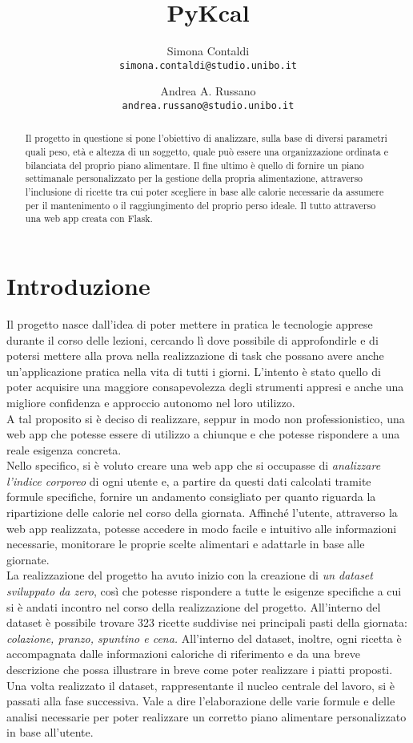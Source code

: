 \documentclass[11pt]{article}
\title{PyKcal}
\author{
  Simona Contaldi\\
  {\tt simona.contaldi@studio.unibo.it} \\
  \and
  Andrea A. Russano\\
  {\tt andrea.russano@studio.unibo.it} \\
}
\date{}
\begin{document}
\maketitle
\begin{abstract}
Il progetto in questione si pone l’obiettivo di analizzare, sulla base di diversi parametri quali peso, età e altezza di un soggetto, quale può essere una organizzazione ordinata e bilanciata del proprio piano alimentare. Il fine ultimo è quello di fornire un piano settimanale personalizzato per la gestione della propria alimentazione, attraverso l'inclusione di ricette tra cui poter scegliere in base alle calorie necessarie da assumere per il mantenimento o il raggiungimento del proprio perso ideale. Il tutto attraverso una web app creata con Flask.
\end{abstract}


\section{Introduzione}

Il progetto nasce dall’idea di poter mettere in pratica le tecnologie apprese durante il corso delle lezioni, cercando lì dove possibile di approfondirle e di potersi mettere alla prova nella realizzazione di task che possano avere anche un'applicazione pratica nella vita di tutti i giorni. 
L'intento è stato quello di poter acquisire una maggiore consapevolezza degli strumenti appresi e anche una migliore confidenza e approccio autonomo nel loro utilizzo. \\
A tal proposito si è deciso di realizzare, seppur in modo non professionistico, una web app che potesse essere di utilizzo a chiunque e che potesse rispondere a una reale esigenza concreta.\\ Nello specifico, si è voluto creare una web app che si occupasse di \textit{analizzare l’indice corporeo} di ogni utente e, a partire da questi dati calcolati tramite formule specifiche, fornire un andamento consigliato per quanto riguarda la ripartizione delle calorie nel corso della giornata. Affinché l'utente, attraverso la web app realizzata, potesse accedere in modo facile e intuitivo alle informazioni necessarie, monitorare le proprie scelte alimentari e adattarle in base alle giornate. \\La realizzazione del progetto ha avuto inizio con la creazione di \textit{un dataset sviluppato da zero}, così che potesse rispondere a tutte le esigenze specifiche a cui si è andati incontro nel corso della realizzazione del progetto. All’interno del dataset è possibile trovare 323 ricette suddivise nei principali pasti della giornata:\textit{ colazione, pranzo, spuntino e cena.} All'interno del dataset, inoltre, ogni ricetta è accompagnata dalle informazioni caloriche di riferimento e da una breve descrizione che possa illustrare in breve come poter realizzare i piatti proposti.\\
Una volta realizzato il dataset, rappresentante il nucleo centrale del lavoro, si è passati alla fase successiva. Vale a dire l'elaborazione delle varie formule e delle analisi necessarie per poter realizzare un corretto piano alimentare personalizzato in base all'utente. 
\end{document}
